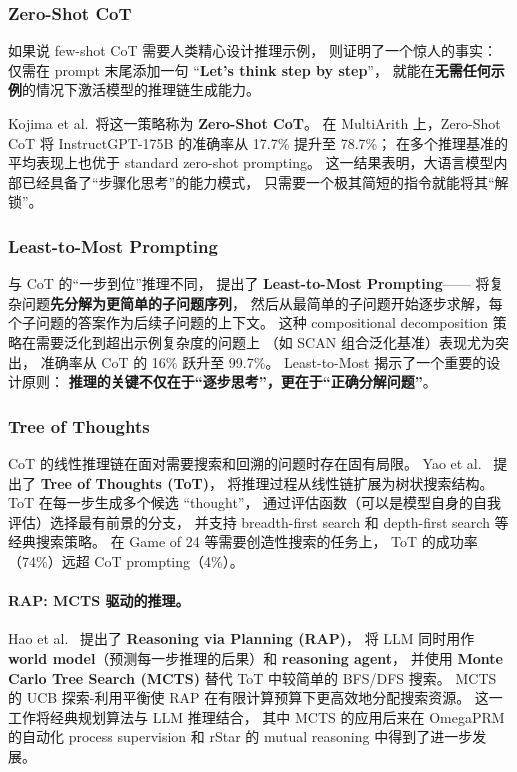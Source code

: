 \subsubsection{Zero-Shot CoT}

如果说 few-shot CoT 需要人类精心设计推理示例，
 则证明了一个惊人的事实：
仅需在 prompt 末尾添加一句 ``\textbf{Let's think step by step}''，
就能在\textbf{无需任何示例}的情况下激活模型的推理链生成能力。

Kojima et al.\ 将这一策略称为 \textbf{Zero-Shot CoT}。
在 MultiArith 上，Zero-Shot CoT 将 InstructGPT-175B 的准确率从 17.7\% 提升至 78.7\%；
在多个推理基准的平均表现上也优于 standard zero-shot prompting。
这一结果表明，大语言模型内部已经具备了``步骤化思考''的能力模式，
只需要一个极其简短的指令就能将其``解锁''。

\subsubsection{Least-to-Most Prompting}

与 CoT 的``一步到位''推理不同，
\citet{zhou2022least} 提出了 \textbf{Least-to-Most Prompting}——
将复杂问题\textbf{先分解为更简单的子问题序列}，
然后从最简单的子问题开始逐步求解，每个子问题的答案作为后续子问题的上下文。
这种 compositional decomposition 策略在需要泛化到超出示例复杂度的问题上
（如 SCAN 组合泛化基准）表现尤为突出，
准确率从 CoT 的 16\% 跃升至 99.7\%。
Least-to-Most 揭示了一个重要的设计原则：
\textbf{推理的关键不仅在于``逐步思考''，更在于``正确分解问题''}。

\subsubsection{Tree of Thoughts}

CoT 的线性推理链在面对需要搜索和回溯的问题时存在固有局限。
Yao et al.\ \cite{yao2023tot} 提出了 \textbf{Tree of Thoughts (ToT)}，
将推理过程从线性链扩展为树状搜索结构。
ToT 在每一步生成多个候选 ``thought''，
通过评估函数（可以是模型自身的自我评估）选择最有前景的分支，
并支持 breadth-first search 和 depth-first search 等经典搜索策略。
在 Game of 24 等需要创造性搜索的任务上，
ToT 的成功率（74\%）远超 CoT prompting（4\%）。

\paragraph{RAP: MCTS 驱动的推理。}
Hao et al.\ \cite{hao2023rap} 提出了 \textbf{Reasoning via Planning (RAP)}，
将 LLM 同时用作\textbf{world model}（预测每一步推理的后果）和 \textbf{reasoning agent}，
并使用 \textbf{Monte Carlo Tree Search (MCTS)} 替代 ToT 中较简单的 BFS/DFS 搜索。
MCTS 的 UCB 探索-利用平衡使 RAP 在有限计算预算下更高效地分配搜索资源。
这一工作将经典规划算法与 LLM 推理结合，
其中 MCTS 的应用后来在 OmegaPRM \cite{luo2024omegaprm} 的自动化 process supervision
和 rStar \cite{qi2024rstar} 的 mutual reasoning 中得到了进一步发展。

